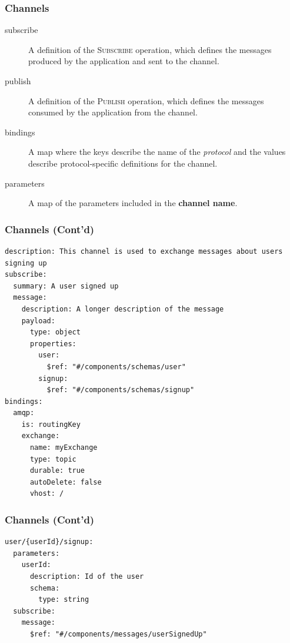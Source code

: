 \documentclass{efd-lecture}
\begin{document}
\begin{frame}
  \frametitle{Channels}
  \begin{description}
    \item[subscribe] A definition of the \textsc{\color{YellowOrange}Subscribe} operation, which defines the messages produced by the application and sent to the channel.
    \item[publish] A definition of the \textsc{\color{LimeGreen}Publish} operation, which defines the messages consumed by the application from the channel.
    \item[bindings] A map where the keys describe the name of the \textit{protocol} and the values describe protocol-specific definitions for the channel.
    \item[parameters] A map of the parameters included in the \textbf{\color{Purple} channel name}.
  \end{description}
\end{frame}

\begin{frame}[fragile]
  \frametitle{Channels (Cont'd)}
  \scriptsize
  \begin{verbatim}
description: This channel is used to exchange messages about users signing up
subscribe:
  summary: A user signed up
  message:
    description: A longer description of the message
    payload:
      type: object
      properties:
        user:
          $ref: "#/components/schemas/user"
        signup:
          $ref: "#/components/schemas/signup"
bindings:
  amqp:
    is: routingKey
    exchange:
      name: myExchange
      type: topic
      durable: true
      autoDelete: false
      vhost: /
  \end{verbatim}
\end{frame}

\begin{frame}[fragile]
  \frametitle{Channels (Cont'd)}
  \scriptsize
  \begin{verbatim}
user/{userId}/signup:
  parameters:
    userId:
      description: Id of the user
      schema:
        type: string
  subscribe:
    message:
      $ref: "#/components/messages/userSignedUp"
  \end{verbatim}
\end{frame}
\end{document}
